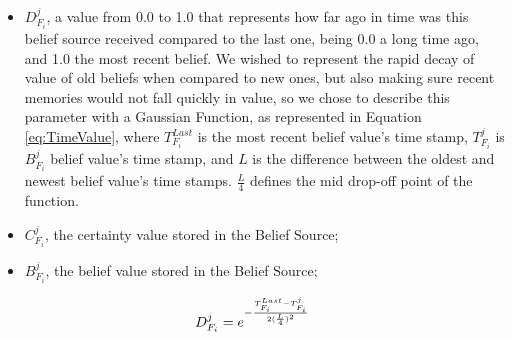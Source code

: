 \begin{itemize}
    \item $D^j_{F_i}$, a value from 0.0 to 1.0 that represents how far ago in time was this belief source received compared to the last one, being 0.0 a long time ago, and 1.0 the most recent belief. We wished to represent the rapid decay of value of old beliefs when compared to new ones, but also making sure recent memories would not fall quickly in value, so we chose to describe this parameter with a Gaussian Function, as represented in Equation \ref{eq:TimeValue}, where $T^{Last}_{F_i}$ is the most recent belief value's time stamp, $T^j_{F_i}$ is $B_{F_i}^j$ belief value's time stamp, and $L$ is the difference between the oldest and newest belief value's time stamps. $\frac{L}{4}$ defines the mid drop-off point of the function.
    \item $C^j_{F_i}$, the certainty value stored in the Belief Source;
    \item $B^j_{F_i}$, the belief value stored in the Belief Source;
\end{itemize}

\begin{equation}
D^j_{F_i} = e^{-\frac{T^{Last}_{F_i} - T^j_{F_i}}{2(\frac{L}{4})^2}}
\label{eq:TimeValue}
\end{equation}


% 


